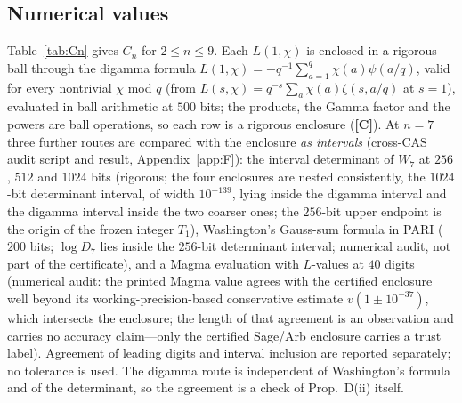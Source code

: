 \documentclass[11pt]{amsart}
\theoremstyle{remark}\newtheorem{remark}[theorem]{Remark}
\theoremstyle{definition}\newtheorem{definition}[theorem]{Definition}
\newcommand{\lbl}[1]{\textbf{[#1]}}\newcommand{\barT}{\bar T_n}
\begin{document}
\subsection{Numerical values}
Table~\ref{tab:Cn} gives $C_n$ for $2\le n\le9$. Each $L(1,\chi)$ is enclosed in a rigorous ball through the digamma formula $L(1,\chi)=-q^{-1}\sum_{a=1}^{q}\chi(a)\psi(a/q)$, valid for every nontrivial $\chi$ mod $q$ (from $L(s,\chi)=q^{-s}\sum_a\chi(a)\zeta(s,a/q)$ at $s=1$), evaluated in ball arithmetic at $500$ bits; the products, the Gamma factor and the powers are ball operations, so each row is a rigorous enclosure (\lbl{C}). At $n=7$ three further routes are compared with the enclosure \emph{as intervals} (cross-CAS audit script and result, Appendix~\ref{app:F}): the interval determinant of $W_7$ at $256$, $512$ and $1024$ bits (rigorous; the four enclosures are nested consistently, the $1024$-bit determinant interval, of width $10^{-139}$, lying inside the digamma interval and the digamma interval inside the two coarser ones; the $256$-bit upper endpoint is the origin of the frozen integer $T_1$), Washington's Gauss-sum formula in PARI ($200$ bits; $\log D_7$ lies inside the $256$-bit determinant interval; numerical audit, not part of the certificate), and a Magma evaluation with $L$-values at $40$ digits (numerical audit: the printed Magma value agrees with the certified enclosure well beyond its working-precision-based conservative estimate $v(1\pm10^{-37})$, which intersects the enclosure; the length of that agreement is an observation and carries no accuracy claim---only the certified Sage/Arb enclosure carries a trust label). Agreement of leading digits and interval inclusion are reported separately; no tolerance is used. The digamma route is independent of Washington's formula and of the determinant, so the agreement is a check of Prop.~D(ii) itself.
\end{document}
